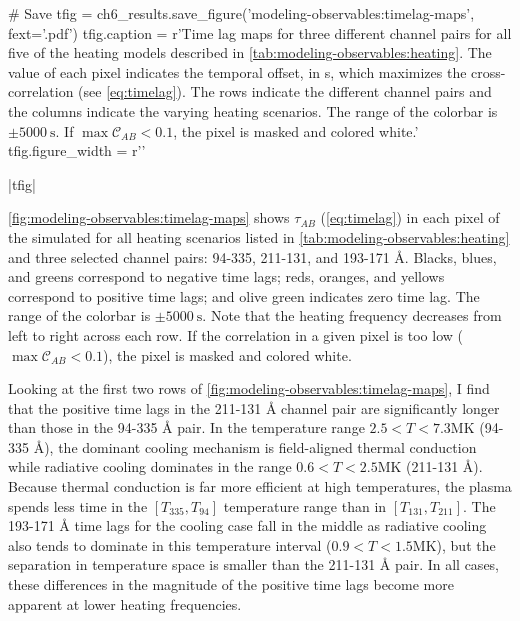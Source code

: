 \begin{pycode}
# Save
tfig = ch6_results.save_figure('modeling-observables:timelag-maps', fext='.pdf')
tfig.caption = r'Time lag maps for three different channel pairs for all five of the heating models described in \autoref{tab:modeling-observables:heating}. The value of each pixel indicates the temporal offset, in \si{\second}, which maximizes the cross-correlation (see \autoref{eq:timelag}). The rows indicate the different channel pairs and the columns indicate the varying heating scenarios. The range of the colorbar is $\pm\SI{5000}{\second}$. If $\max{\mathcal{C}_{AB}}<0.1$, the pixel is masked and colored white.'
tfig.figure_width = r'\textwidth'
\end{pycode}
|tfig|

\autoref{fig:modeling-observables:timelag-maps} shows $\tau_{AB}$ (\autoref{eq:timelag}) in each pixel of the simulated \AR{} for all heating scenarios listed in \autoref{tab:modeling-observables:heating} and three selected channel pairs: 94-335, 211-131, and 193-171 \si{\angstrom}. Blacks, blues, and greens correspond to negative time lags; reds, oranges, and yellows correspond to positive time lags; and olive green indicates zero time lag. The range of the colorbar is $\pm\SI{5000}{\second}$. Note that the heating frequency decreases from left to right across each row. If the correlation in a given pixel is too low ($\max{\mathcal{C}_{AB}}<0.1$), the pixel is masked and colored white.

Looking at the first two rows of \autoref{fig:modeling-observables:timelag-maps}, I find that the positive time lags in the 211-131 \si{\angstrom} channel pair are significantly longer than those in the 94-335 \AA{} pair. In the temperature range $2.5<T<7.3\si{\mega\kelvin}$ (94-335 \si{\angstrom}), the dominant cooling mechanism is field-aligned thermal conduction while radiative cooling dominates in the range $0.6<T<2.5\si{\mega\kelvin}$ (211-131 \si{\angstrom}). Because thermal conduction is far more efficient at high temperatures, the plasma spends less time in the $[T_{335},T_{94}]$ temperature range than in $[T_{131},T_{211}]$. The 193-171 \si{\angstrom} time lags for the cooling case fall in the middle as radiative cooling also tends to dominate in this temperature interval ($0.9<T<1.5\si{\mega\kelvin}$), but the separation in temperature space is smaller than the 211-131 \si{\angstrom} pair. In all cases, these differences in the magnitude of the positive time lags become more apparent at lower heating frequencies.

